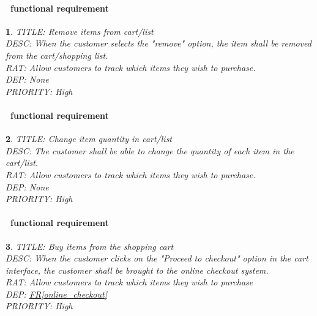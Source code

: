 \documentclass{scrreprt}
\theoremstyle{funreq}
\newtheorem{funreq}{}
\newcommand*{\reqref}[1]{\hyperref[#1]{FR\ref*{#1}}}
\begin{document}
	\paragraph[]{\Subsectionname ~functional requirement }
	\begin{funreq}
		\label{cart_remove}
		TITLE: Remove items from cart/list\\
		DESC: When the customer selects the "remove" option, the item shall be removed from the cart/shopping list.\\
		RAT: Allow customers to track which items they wish to purchase.\\
		DEP: None\\
		PRIORITY: High\\
	\end{funreq}

	\paragraph[]{\Subsectionname ~functional requirement }
	\begin{funreq}
		\label{cart_changequantity}
		TITLE: Change item quantity in cart/list\\
		DESC: The customer shall be able to change the quantity of each item in the cart/list.\\
		RAT: Allow customers to track which items they wish to purchase.\\
		DEP: None\\
		PRIORITY: High\\
	\end{funreq}
	
	\paragraph[]{\Subsectionname ~functional requirement }
	\begin{funreq}
		\label{cart_buy}
		TITLE: Buy items from the shopping cart\\
		DESC: When the customer clicks on the "Proceed to checkout" option in the cart interface, the customer shall be brought to the online checkout system.\\
		RAT: Allow customers to track which items they wish to purchase\\
		DEP: \reqref{online_checkout}\\
		PRIORITY: High\\
	\end{funreq}
	
\end{document}
